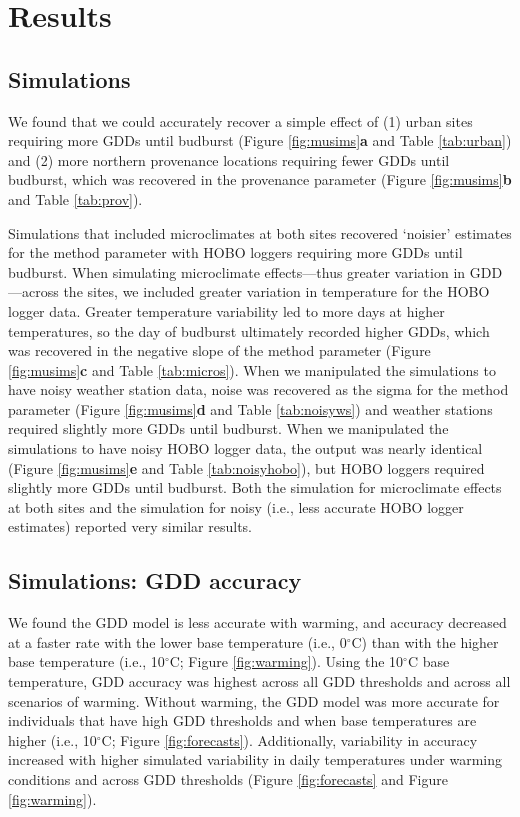 \documentclass{article}\usepackage[]{graphicx}\usepackage[]{color}
\begin{document}
\section*{Results}
\subsection*{Simulations}
We found that we could accurately recover a simple effect of (1) urban sites requiring more GDDs until budburst (Figure \ref{fig:musims}\textbf{a} and Table \ref{tab:urban}) and (2) more northern provenance locations requiring fewer GDDs until budburst, which was recovered in the provenance parameter (Figure \ref{fig:musims}\textbf{b} and Table \ref{tab:prov}). 

Simulations that included microclimates at both sites recovered `noisier' estimates for the method parameter with HOBO loggers requiring more GDDs until budburst. When simulating microclimate effects---thus greater variation in GDD---across the sites, we included greater variation in temperature for the HOBO logger data. Greater temperature variability led to more days at higher temperatures, so the day of budburst ultimately recorded higher GDDs, which was recovered in the negative slope of the method parameter (Figure \ref{fig:musims}\textbf{c} and Table \ref{tab:micros}). When we manipulated the simulations to have noisy weather station data, noise was recovered as the sigma for the method parameter (Figure \ref{fig:musims}\textbf{d} and Table \ref{tab:noisyws}) and weather stations required slightly more GDDs until budburst. When we manipulated the simulations to have noisy HOBO logger data, the output was nearly identical (Figure \ref{fig:musims}\textbf{e} and Table \ref{tab:noisyhobo}), but HOBO loggers required slightly more GDDs until budburst. Both the simulation for microclimate effects at both sites and the simulation for noisy (i.e., less accurate HOBO logger estimates) reported very similar results.  
  
\subsection*{Simulations: GDD accuracy}
We found the GDD model is less accurate with warming, and accuracy decreased at a faster rate with the lower base temperature (i.e., 0$^{\circ}$C) than with the higher base temperature (i.e., 10$^{\circ}$C; Figure \ref{fig:warming}). Using the 10$^{\circ}$C base temperature, GDD accuracy was highest across all GDD thresholds and across all scenarios of warming. Without warming, the GDD model was more accurate for individuals that have high GDD thresholds and when base temperatures are higher (i.e., 10$^{\circ}$C; Figure \ref{fig:forecasts}). Additionally, variability in accuracy increased with higher simulated variability in daily temperatures under warming conditions and across GDD thresholds (Figure \ref{fig:forecasts} and Figure \ref{fig:warming}).
\end{document}
